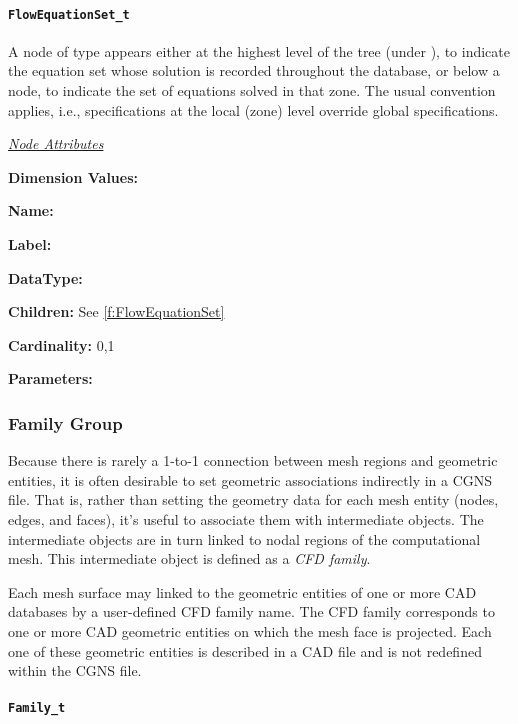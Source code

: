 \paragraph{\texttt{FlowEquationSet\_t}}

A node of type  appears either at the highest
level of the tree (under ), to indicate the equation
set whose solution is recorded throughout the database, or below a
 node, to indicate the set of equations solved in that
zone. The usual convention applies, i.e., specifications at the local
(zone) level override global specifications.

\textit{\uline{Node Attributes}}
\begin{Ventryic}{\textbf{Dimension Values:}}
\item [\textbf{Name:}]
\item [\textbf{Label:}]
\item [\textbf{DataType:}]
\item [\textbf{Children:}]
      See \autoref{f:FlowEquationSet}
\item [\textbf{Cardinality:}]
      0,1
\item [\textbf{Parameters:}]
\end{Ventryic}

\subsubsection{Family Group}

Because there is rarely a 1-to-1 connection between mesh regions and
geometric entities, it is often desirable to set geometric associations
indirectly in a CGNS file.
That is, rather than setting the geometry data for each mesh entity
(nodes, edges, and faces), it's useful to associate them with
intermediate objects.
The intermediate objects are in turn linked to nodal regions of the
computational mesh.
This intermediate object is defined as a \emph{CFD family}.

Each mesh surface may linked to the geometric entities of one or more CAD
databases by a user-defined CFD family name.
The CFD family corresponds to one or more CAD geometric entities on which
the mesh face is projected.
Each one of these geometric entities is described in a CAD file and is
not redefined within the CGNS file.

\paragraph{\texttt{Family\_t}}

